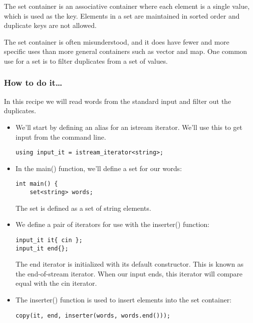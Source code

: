 
The set container is an associative container where each element is a single value, which is used as the key. Elements in a set are maintained in sorted order and duplicate keys are not allowed.

The set container is often misunderstood, and it does have fewer and more specific uses than more general containers such as vector and map. One common use for a set is to filter duplicates from a set of values.

\subsubsection{How to do it…}

In this recipe we will read words from the standard input and filter out the duplicates.

\begin{itemize}
\item 
We'll start by defining an alias for an istream iterator. We'll use this to get input from the command line.

\begin{lstlisting}[style=styleCXX]
using input_it = istream_iterator<string>;
\end{lstlisting}

\item 
In the main() function, we'll define a set for our words:

\begin{lstlisting}[style=styleCXX]
int main() {
	set<string> words;
\end{lstlisting}

The set is defined as a set of string elements.

\item 
We define a pair of iterators for use with the inserter() function:

\begin{lstlisting}[style=styleCXX]
input_it it{ cin };
input_it end{};
\end{lstlisting}

The end iterator is initialized with its default constructor. This is known as the end-of-stream iterator. When our input ends, this iterator will compare equal with the cin iterator.

\item 
The inserter() function is used to insert elements into the set container:

\begin{lstlisting}[style=styleCXX]
copy(it, end, inserter(words, words.end()));
\end{lstlisting}


\end{itemize}
